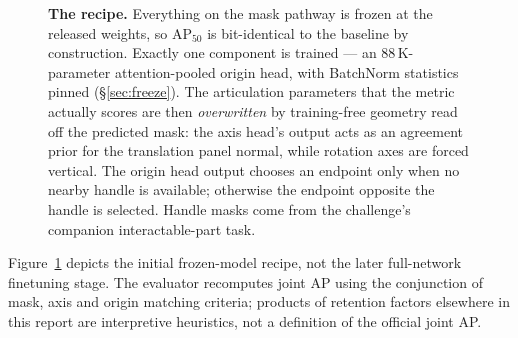 \documentclass[11pt]{article}
\newcommand{\apfifty}{AP$_{50}$}
\begin{document}
\begin{figure}[t]
{%
}
\caption{\textbf{The recipe.} Everything on the mask pathway is frozen at the
released weights, so \apfifty{} is bit-identical to the baseline by
construction. Exactly one component is trained --- an $88$\,K-parameter
attention-pooled origin head, with BatchNorm statistics pinned
(\S\ref{sec:freeze}). The articulation parameters that the metric actually
scores are then \emph{overwritten} by training-free geometry read off the
predicted mask: the axis head's output acts as an agreement prior for the
translation panel normal, while rotation axes are forced vertical. The origin
head output chooses an endpoint only when no nearby handle is available;
otherwise the endpoint opposite the handle is selected. Handle masks come
from the challenge's companion interactable-part task.}
\label{fig:pipeline}
\end{figure}

Figure~\ref{fig:pipeline} depicts the initial frozen-model recipe, not the
later full-network finetuning stage. The evaluator recomputes joint AP using
the conjunction of mask, axis and origin matching criteria; products of
retention factors elsewhere in this report are interpretive heuristics,
not a definition of the official joint AP.
\end{document}
